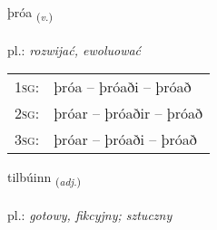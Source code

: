 \documentclass[frontgrid, backgrid]{flacards}\usepackage[]{graphicx}\usepackage[]{xcolor}
\begin{document}
\renewcommand{\blhead}{\vskip5pt {\small\bfseries\footnotesize Sagnorð | czasownik }}
\renewcommand{\bcfoot}{\vskip5pt \hspace{2pt}{\small\bfseries\footnotesize 1K}}


{þróa \small{\textsubscript{(\textit{v.})}} \\[1ex] %
\textphonetic{[θrouːa]} \\
pl.: \emph{rozwijać, ewoluować} \\  [2ex]
\renewcommand*{\arraystretch}{0.8}
\begin{tabular}{p{1cm}l}
\textsc{1sg}: & þróa -- þróaði -- þróað \\ 
\textsc{2sg}: & þróar -- þróaðir -- þróað \\ 
\textsc{3sg}: & þróar -- þróaði -- þróað \\ 
\end{tabular}
}

\renewcommand{\flhead}{\vskip5pt \fboxsep=0pt {\small\bfseries\footnotesize Lýsingarorð | przymiotnik}}
\renewcommand{\fcfoot}{\vskip5pt \fboxsep=0pt \hspace{2pt}{\small\bfseries\footnotesize 1K}}

\renewcommand{\blhead}{\vskip5pt {\small\bfseries\footnotesize Lýsingarorð | przymiotnik }}
\renewcommand{\bcfoot}{\vskip5pt \hspace{2pt}{\small\bfseries\footnotesize 1K}}


{tilbúinn \small{\textsubscript{(\textit{adj.})}} \\[1ex] %
\textphonetic{[tʰɪlpuɪn]} \\
pl.: \emph{gotowy, fikcyjny; sztuczny} \\  [2ex]
\renewcommand*{\arraystretch}{0.8}
}
\end{document}
